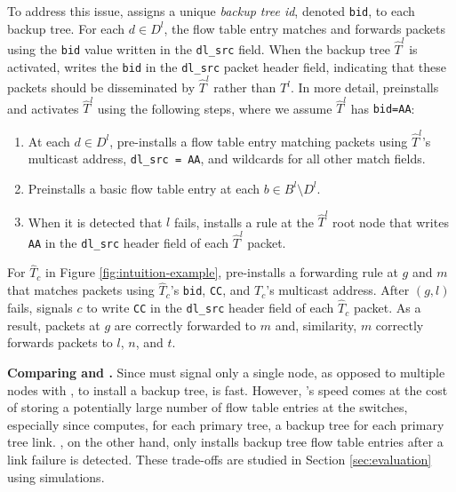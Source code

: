 To address this issue, \pre assigns a unique \emph{backup tree id}, denoted {\tt bid}, to each backup tree.  For each $d \in D^l$, the flow table entry matches and forwards packets
using the {\tt bid} value written in the {\tt dl\_src} field. When the backup tree $\hat{T}^l$ is activated, \pre writes the {\tt bid} in the
{\tt dl\_src} packet header field, indicating that these packets should be disseminated by $\hat{T}^l$ rather than $T^l$.
In more detail, \pre preinstalls and activates $\hat{T}^l$ using the following steps, where we assume $\hat{T}^l$ has {\tt bid=AA}:
\begin{enumerate}
	
	\item At each $d \in D^l$, \pre pre-installs a flow table entry matching packets using $\hat{T}^l$'s multicast address, {\tt dl\_src = AA}, and wildcards for all other match fields. 
	
	\item Preinstalls a basic flow table entry at each $b \in B^l \setminus D^l$.

	\item When it is detected that $l$ fails, \pre installs a rule at the $\hat{T}^l$ root node that writes {\tt AA} in the {\tt dl\_src} header field of each $\hat{T}^l$ packet.
\end{enumerate}

For $\hat{T}_c$ in Figure \ref{fig:intuition-example}, \pre pre-installs a forwarding rule at $g$ and $m$ that matches packets using $\hat{T}_c$'s {\tt bid}, {\tt CC}, and $T_c$'s multicast 
address.  After $(g,l)$ fails, \pre signals $c$ to write {\tt CC} in the {\tt dl\_src} header field of each $\hat{T}_c$ packet.  As a result, packets at $g$ are correctly forwarded to
$m$ and, similarity, $m$ correctly forwards packets to $l$, $n$, and $t$.

{\bf Comparing \pre and \posts.}
Since \pre must signal only a single node, as opposed to multiple nodes with \posts, to install a backup tree, \pre is fast. However, \pres's speed comes at the cost of 
storing a potentially large number of flow table entries at the switches, especially since \mdr computes, for each primary tree, a backup tree for each primary tree link. \post, on the other hand,
only installs backup tree flow table entries after a link failure is detected.
These trade-offs are studied in Section \ref{sec:evaluation} using simulations.

